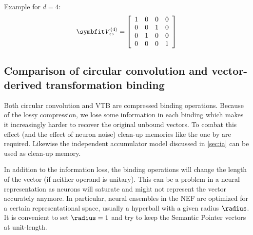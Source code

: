 Example for $d = 4$:
\begin{equation*}
    \mat V_{\leftrightarrow}^{(4)} = \sbr{\begin{array}{cccc}
            1 & 0 & 0 & 0 \\
            0 & 0 & 1 & 0 \\
            0 & 1 & 0 & 0 \\
            0 & 0 & 0 & 1
        \end{array}}
\end{equation*}

\subsection{Comparison of circular convolution and vector-derived transformation binding}
Both circular convolution and VTB are compressed binding operations.
Because of the lossy compression, we lose some information in each binding which makes it increasingly harder to recover the original unbound vectors.
To combat this effect (and the effect of neuron noise) clean-up memories like the one by \textcite{stewart2011} are required.
Likewise the independent accumulator model discussed in \cref{sec:ia} can be used as clean-up memory.

In addition to the information loss, the binding operations will change the length of the vector (if neither operand is unitary).
This can be a problem in a neural representation as neurons will saturate and might not represent the vector accurately anymore.
In particular, neural ensembles in the NEF are optimized for a certain representational space, usually a hyperball with a given radius $\radius$.
It is convenient to set $\radius = 1$ and try to keep the Semantic Pointer vectors at unit-length.

